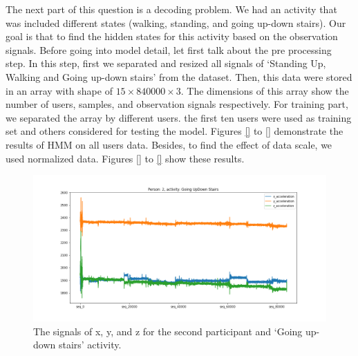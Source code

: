 The next part of this question is a decoding problem. We had an activity that was included different states (walking, standing, and going up-down stairs). Our goal is that to find the hidden states for this activity based on the observation signals.
Before going into model detail, let first talk about the pre processing step. In this step, first we separated and resized all signals of ‘Standing  Up,  Walking  and  Going  up-down  stairs’ from the dataset. Then, this data were stored in an array with shape of $15 \times 840000 \times 3$. The dimensions of this array show the number of users,  samples, and observation signals respectively.
For training part, we separated the array by different users. the first ten users were used as training set and others considered for testing the model. Figures \ref{} to \ref{} demonstrate the results of HMM on all users data. Besides, to find the effect of data scale, we used normalized data. Figures \ref{} to \ref{} show these results.
\begin{figure}[H]
    \centering
    \begin{minipage}[b]{1\textwidth}
        \includegraphics[width=\textwidth]{manuscript/src/figures/Ass3/Ass3_Q2_raw_signal.png}
    \end{minipage}
    \caption{The signals of x, y, and z for the second participant and ‘Going  up-down  stairs’ activity.}
    \label{fig:Ass3_Q2_raw_signal}
\end{figure}





